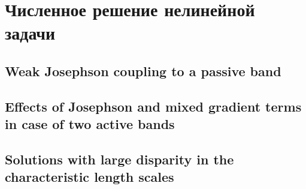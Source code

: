 \chapter{Численное решение нелинейной задачи}

\section{Weak Josephson coupling to a passive band}

\section{Effects of Josephson and mixed gradient terms in case of two active
  bands}

\section{Solutions with large disparity in the characteristic length scales}
